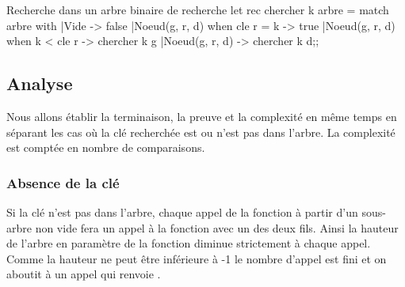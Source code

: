\begin{figure*}[h]
\centering
{}
\caption{Recherche de 23 dans l'arbre $a_0$}
\end{figure*}
\begin{code}{Recherche dans un arbre binaire de recherche}
let rec chercher k arbre = 
  match arbre with
  |Vide -> false
  |Noeud(g, r, d) when cle r = k -> true
  |Noeud(g, r, d) when k < cle r -> chercher k g
  |Noeud(g, r, d) -> chercher k d;;
\end{code}
\subsection{Analyse}
Nous allons établir la terminaison, la preuve et la complexité en même temps en séparant les cas où la clé recherchée est ou n'est pas dans l'arbre.  La complexité est comptée en nombre de comparaisons.
\subsubsection{Absence de la clé}
 Si la clé n'est pas dans l'arbre, chaque appel de la fonction à partir d'un sous-arbre non vide fera un appel à la fonction avec un des deux fils. Ainsi la hauteur de l'arbre en paramètre de la fonction diminue strictement à chaque appel. Comme la hauteur ne peut être inférieure à -1 le nombre d'appel est fini et on aboutit à un appel  qui renvoie .
 
